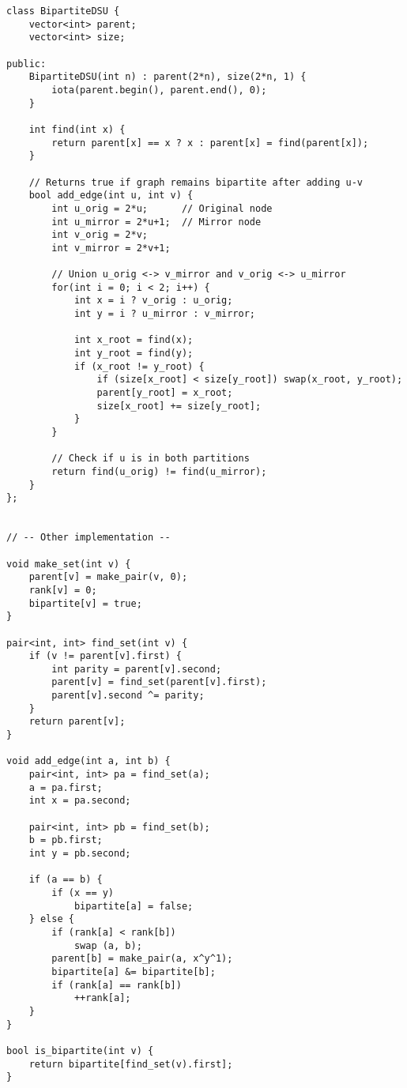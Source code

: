 \documentclass[10pt]{article}
\begin{document}
\begin{multicols*}{2}
\begin{lstlisting}[style=compactcpp]
class BipartiteDSU {
    vector<int> parent;
    vector<int> size;

public:
    BipartiteDSU(int n) : parent(2*n), size(2*n, 1) {
        iota(parent.begin(), parent.end(), 0);
    }

    int find(int x) {
        return parent[x] == x ? x : parent[x] = find(parent[x]);
    }

    // Returns true if graph remains bipartite after adding u-v
    bool add_edge(int u, int v) {
        int u_orig = 2*u;      // Original node
        int u_mirror = 2*u+1;  // Mirror node
        int v_orig = 2*v;
        int v_mirror = 2*v+1;

        // Union u_orig <-> v_mirror and v_orig <-> u_mirror
        for(int i = 0; i < 2; i++) {
            int x = i ? v_orig : u_orig;
            int y = i ? u_mirror : v_mirror;
            
            int x_root = find(x);
            int y_root = find(y);
            if (x_root != y_root) {
                if (size[x_root] < size[y_root]) swap(x_root, y_root);
                parent[y_root] = x_root;
                size[x_root] += size[y_root];
            }
        }

        // Check if u is in both partitions
        return find(u_orig) != find(u_mirror);
    }
};


// -- Other implementation --

void make_set(int v) {
    parent[v] = make_pair(v, 0);
    rank[v] = 0;
    bipartite[v] = true;
}

pair<int, int> find_set(int v) {
    if (v != parent[v].first) {
        int parity = parent[v].second;
        parent[v] = find_set(parent[v].first);
        parent[v].second ^= parity;
    }
    return parent[v];
}

void add_edge(int a, int b) {
    pair<int, int> pa = find_set(a);
    a = pa.first;
    int x = pa.second;

    pair<int, int> pb = find_set(b);
    b = pb.first;
    int y = pb.second;

    if (a == b) {
        if (x == y)
            bipartite[a] = false;
    } else {
        if (rank[a] < rank[b])
            swap (a, b);
        parent[b] = make_pair(a, x^y^1);
        bipartite[a] &= bipartite[b];
        if (rank[a] == rank[b])
            ++rank[a];
    }
}

bool is_bipartite(int v) {
    return bipartite[find_set(v).first];
}


\end{lstlisting}
\end{multicols*}
\end{document}
